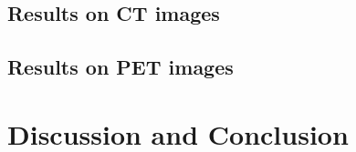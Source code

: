 \documentclass[portrait,color=UCLrichred,margin=3cm]{uclposter}
\begin{document}
\begin{multicols}{4}
\subsection*{Results on CT images}
\subsection*{Results on PET images}

\section*{Discussion and Conclusion}





\AtNextBibliography{\small}
\printbibliography

\end{multicols}
	
\end{document}
